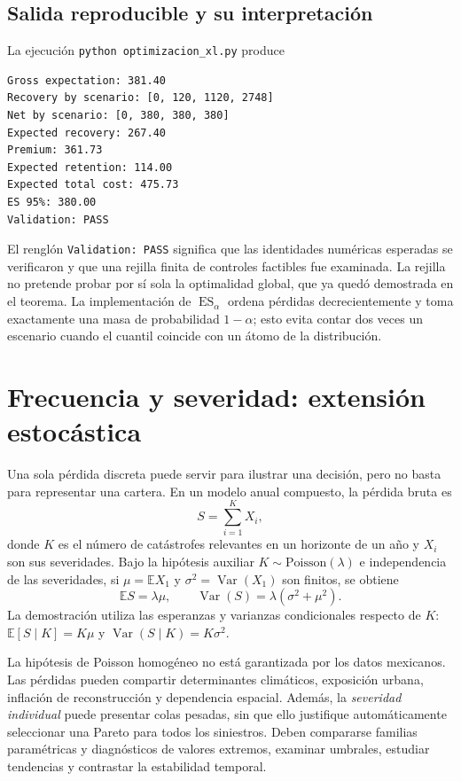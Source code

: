 \documentclass[11pt,reqno]{amsart}
\theoremstyle{definition}\newtheorem{definition}[theorem]{Definición}
\theoremstyle{remark}\newtheorem{remark}[theorem]{Observación}
\DeclareMathOperator{\ES}{ES}
\newcommand{\E}{\mathbb E}
\begin{document}


\subsection{Salida reproducible y su interpretación}
La ejecución \texttt{python optimizacion\_xl.py} produce
\begin{Verbatim}[fontsize=\small]
Gross expectation: 381.40
Recovery by scenario: [0, 120, 1120, 2748]
Net by scenario: [0, 380, 380, 380]
Expected recovery: 267.40
Premium: 361.73
Expected retention: 114.00
Expected total cost: 475.73
ES 95%: 380.00
Validation: PASS
\end{Verbatim}
El renglón \texttt{Validation: PASS} significa que las identidades numéricas esperadas se verificaron y que una rejilla finita de controles factibles fue examinada. La rejilla no pretende probar por sí sola la optimalidad global, que ya quedó demostrada en el teorema. La implementación de $\ES_\alpha$ ordena pérdidas decrecientemente y toma exactamente una masa de probabilidad $1-\alpha$; esto evita contar dos veces un escenario cuando el cuantil coincide con un átomo de la distribución.

\section{Frecuencia y severidad: extensión estocástica}
Una sola pérdida discreta puede servir para ilustrar una decisión, pero no basta para representar una cartera. En un modelo anual compuesto, la pérdida bruta es
\begin{equation}\label{eq:compound}
S=\sum_{i=1}^K X_i,
\end{equation}
donde $K$ es el número de catástrofes relevantes en un horizonte de un año y $X_i$ son sus severidades. Bajo la hipótesis auxiliar $K\sim\mathrm{Poisson}(\lambda)$ e independencia de las severidades, si $\mu=\E X_1$ y $\sigma^2=\operatorname{Var}(X_1)$ son finitos, se obtiene
\begin{equation}
\E S=\lambda\mu,\qquad \operatorname{Var}(S)=\lambda(\sigma^2+\mu^2).
\end{equation}
La demostración utiliza las esperanzas y varianzas condicionales respecto de $K$:
$\E[S\mid K]=K\mu$ y $\operatorname{Var}(S\mid K)=K\sigma^2$.

La hipótesis de Poisson homogéneo no está garantizada por los datos mexicanos. Las pérdidas pueden compartir determinantes climáticos, exposición urbana, inflación de reconstrucción y dependencia espacial. Además, la \emph{severidad individual} puede presentar colas pesadas, sin que ello justifique automáticamente seleccionar una Pareto para todos los siniestros. Deben compararse familias paramétricas y diagnósticos de valores extremos, examinar umbrales, estudiar tendencias y contrastar la estabilidad temporal.
\end{document}
